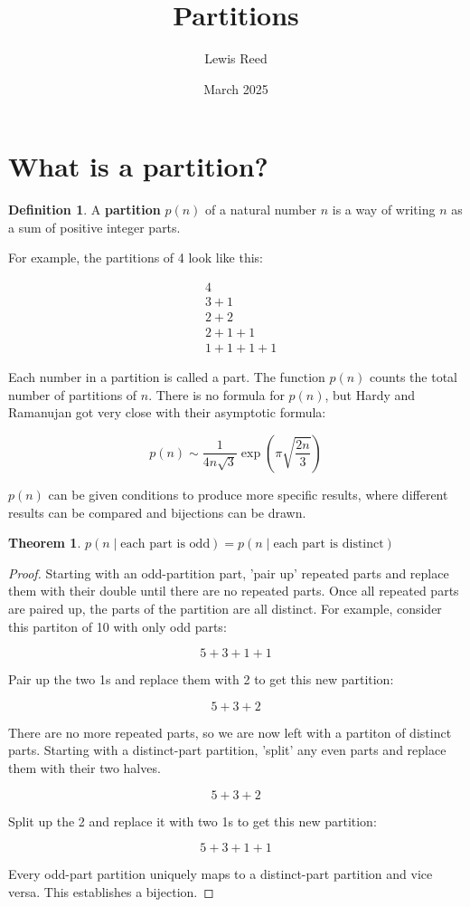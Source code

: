 \documentclass{article}
\title{Partitions}
\author{Lewis Reed}
\date{March 2025}
\theoremstyle{definition}
\newtheorem{definition}{Definition}
\newtheorem{theorem}{Theorem}
\begin{document}
\maketitle

\section{What is a partition?}

\begin{definition}
    A \textbf{partition} $p(n)$ of a natural number $n$ is a way of writing $n$ as a sum of positive integer parts.
\end{definition}

\noindent
For example, the partitions of 4 look like this:

\[
\begin{aligned}
&4 \\
&3 + 1 \\
&2 + 2 \\
&2 + 1 + 1 \\
&1 + 1 + 1 + 1
\end{aligned}
\]

\noindent
Each number in a partition is called a part. The function $p(n)$ counts the total number of partitions of $n$.
There is no formula for $p(n)$, but Hardy and Ramanujan got very close with their asymptotic formula:

\[
p(n) \sim \frac{1}{4n\sqrt{3}}\exp\left(\pi\sqrt{\frac{2n}{3}}\right)
\]

\noindent
$p(n)$ can be given conditions to produce more specific results, where different results can be compared
and bijections can be drawn.

\begin{theorem}
    $p(n \mid \text{each part is odd}) = p(n \mid \text{each part is distinct})$
\end{theorem}
    
\begin{proof}
Starting with an odd-partition part, 'pair up' repeated parts and replace them with their double until there are
no repeated parts. Once all repeated parts are paired up, the parts of the partition are all distinct.
\newline For example, consider this partiton of 10 with only odd parts:

\[
5 + 3 + 1 + 1
\]

\noindent
Pair up the two 1s and replace them with 2 to get this new partition:

\[
5 + 3 + 2
\]

\noindent
There are no more repeated parts, so we are now left with a partiton of distinct parts.
\newline Starting with a distinct-part partition, 'split' any even parts and replace them with their two halves.

\[
5 + 3 + 2
\]

\noindent
Split up the 2 and replace it with two 1s to get this new partition:

\[
5 + 3 + 1 + 1
\]

\noindent
Every odd-part partition uniquely maps to a distinct-part partition and vice versa. This establishes a bijection.
\end{proof}
\end{document}

